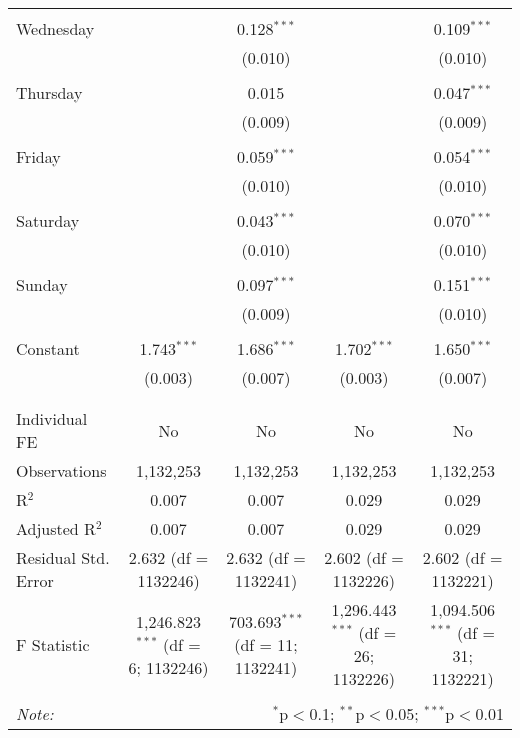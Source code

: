 \documentclass[
]{article}
\begin{document}
\begin{table}[!htbp]
{\begin{tabular}{@{\extracolsep{5pt}}lcccc}
  & & & & \\ 
 Wednesday &  & 0.128$^{***}$ &  & 0.109$^{***}$ \\ 
  &  & (0.010) &  & (0.010) \\ 
  & & & & \\ 
 Thursday &  & 0.015 &  & 0.047$^{***}$ \\ 
  &  & (0.009) &  & (0.009) \\ 
  & & & & \\ 
 Friday &  & 0.059$^{***}$ &  & 0.054$^{***}$ \\ 
  &  & (0.010) &  & (0.010) \\ 
  & & & & \\ 
 Saturday &  & 0.043$^{***}$ &  & 0.070$^{***}$ \\ 
  &  & (0.010) &  & (0.010) \\ 
  & & & & \\ 
 Sunday &  & 0.097$^{***}$ &  & 0.151$^{***}$ \\ 
  &  & (0.009) &  & (0.010) \\ 
  & & & & \\ 
 Constant & 1.743$^{***}$ & 1.686$^{***}$ & 1.702$^{***}$ & 1.650$^{***}$ \\ 
  & (0.003) & (0.007) & (0.003) & (0.007) \\ 
  & & & & \\ 
\hline \\[-1.8ex] 
Individual FE & No & No & No & No \\ 
Observations & 1,132,253 & 1,132,253 & 1,132,253 & 1,132,253 \\ 
R$^{2}$ & 0.007 & 0.007 & 0.029 & 0.029 \\ 
Adjusted R$^{2}$ & 0.007 & 0.007 & 0.029 & 0.029 \\ 
Residual Std. Error & 2.632 (df = 1132246) & 2.632 (df = 1132241) & 2.602 (df = 1132226) & 2.602 (df = 1132221) \\ 
F Statistic & 1,246.823$^{***}$ (df = 6; 1132246) & 703.693$^{***}$ (df = 11; 1132241) & 1,296.443$^{***}$ (df = 26; 1132226) & 1,094.506$^{***}$ (df = 31; 1132221) \\ 
\hline 
\hline \\[-1.8ex] 
\textit{Note:}  & \multicolumn{4}{r}{$^{*}$p$<$0.1; $^{**}$p$<$0.05; $^{***}$p$<$0.01} \\ 
\end{tabular}
} 
\end{table} 
\newpage
\end{document}
